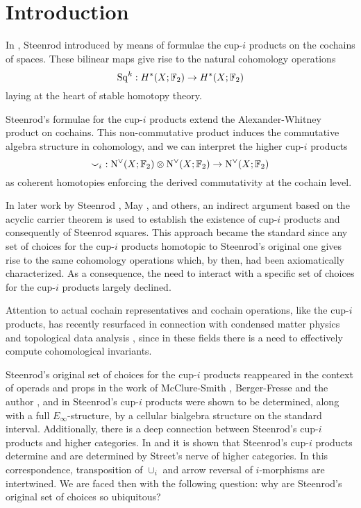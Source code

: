 
\section{Introduction} \label{s:introduction}

In \cite{steenrod1947products}, Steenrod introduced by means of formulae the cup-$i$ products on the cochains of spaces. These bilinear maps give rise to the natural cohomology operations
\begin{equation*}
\mathrm{Sq}^k : H^*(X; \mathbb{F}_2) \to H^{*}(X; \mathbb{F}_2)
\end{equation*}
laying at the heart of stable homotopy theory.

Steenrod's formulae for the cup-$i$ products extend the Alexander-Whitney product on cochains. This non-commutative product induces the commutative algebra structure in cohomology, and we can interpret the higher cup-$i$ products
\begin{equation*}
\smallsmile_i\ : \operatorname{N^{\vee}}(X; \mathbb{F}_2) \otimes \operatorname{N^{\vee}}(X; \mathbb{F}_2) \to \operatorname{N^{\vee}}(X; \mathbb{F}_2)
\end{equation*}
as coherent homotopies enforcing the derived commutativity at the cochain level.

In later work by Steenrod \cite{steenrod1962cohomology}, May \cite{may1970general}, and others, an indirect argument based on the acyclic carrier theorem is used to establish the existence of cup-$i$ products and consequently of Steenrod squares. This approach became the standard since any set of choices for the cup-$i$ products homotopic to Steenrod's original one gives rise to the same cohomology operations which, by then, had been axiomatically characterized. As a consequence, the need to interact with a specific set of choices for the cup-$i$ products largely declined.

Attention to actual cochain representatives and cochain operations, like the \mbox{cup-$i$} products, has recently resurfaced in connection with condensed matter physics \cite{} and topological data analysis \cite{carlsson2009topology,tauzin2020giottotda}, since in these fields there is a need to effectively compute cohomological invariants.

Steenrod's original set of choices for the cup-$i$ products reappeared in the context of operads and props in the work of McClure-Smith \cite{mcclure2003multivariable}, Berger-Fresse \cite{berger2004combinatorial} and the author \cite{medina2018algebraic}, and in \cite{medina2018cellular} Steenrod's cup-$i$ products were shown to be determined, along with a full $E_\infty$-structure, by a cellular bialgebra structure on the standard interval. Additionally, there is a deep connection between Steenrod's cup-$i$ products and higher categories. In \cite{medina2019globular} and \cite{bibid} it is shown that Steenrod's cup-$i$ products determine and are determined by Street's nerve of higher categories. In this correspondence, transposition of $\cup_i$ and arrow reversal of $i$-morphisms are intertwined. We are faced then with the following question: why are Steenrod's original set of choices so ubiquitous?

